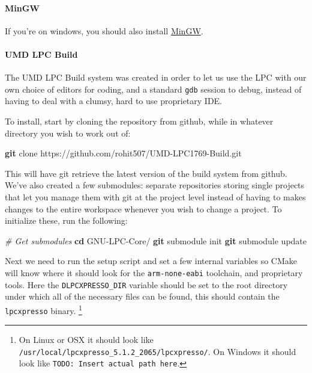 \documentclass[]{article}
\newenvironment{Shaded}{\begin{snugshade}}{\end{snugshade}}
\newcommand{\KeywordTok}[1]{\textcolor[rgb]{0.13,0.29,0.53}{\textbf{{#1}}}}
\newcommand{\CommentTok}[1]{\textcolor[rgb]{0.56,0.35,0.01}{\textit{{#1}}}}
\newcommand{\NormalTok}[1]{{#1}}
\begin{document}
\paragraph{MinGW}

If you're on windows, you should also install
\href{http://www.mingw.org}{MinGW}.


\paragraph{UMD LPC Build}

The UMD LPC Build system was created in order to let us use the LPC with
our own choice of editors for coding, and a standard \texttt{gdb}
session to debug, instead of having to deal with a clumsy, hard to use
proprietary IDE.

To install, start by cloning the repository from github, while in
whatever directory you wish to work out of:

\begin{Shaded}
\begin{Highlighting}[]
    \KeywordTok{git} \NormalTok{clone https://github.com/rohit507/UMD-LPC1769-Build.git}
\end{Highlighting}
\end{Shaded}

This will have git retrieve the latest version of the build system from
github. We've also created a few submodules: separate repositories
storing single projects that let you manage them with git at the project
level instead of having to makes changes to the entire workspace
whenever you wish to change a project. To initialize these, run the
following:

\begin{Shaded}
\begin{Highlighting}[]
    \CommentTok{# Get submodules}
    \KeywordTok{cd} \NormalTok{GNU-LPC-Core/}
    \KeywordTok{git} \NormalTok{submodule init}
    \KeywordTok{git} \NormalTok{submodule update}
\end{Highlighting}
\end{Shaded}

Next we need to run the setup script and set a few internal variables so
CMake will know where it should look for the \texttt{arm-none-eabi}
toolchain, and proprietary tools. Here the \texttt{DLPCXPRESSO\_DIR}
variable should be set to the root directory under which all of the
necessary files can be found, this should contain the
\texttt{lpcxpresso}
binary. \footnote{On
  Linux or OSX it should look like
  \texttt{/usr/local/lpcxpresso\_5.1.2\_2065/lpcxpresso/}. On Windows it
  should look like \texttt{TODO: Insert actual path here}.}
\end{document}
